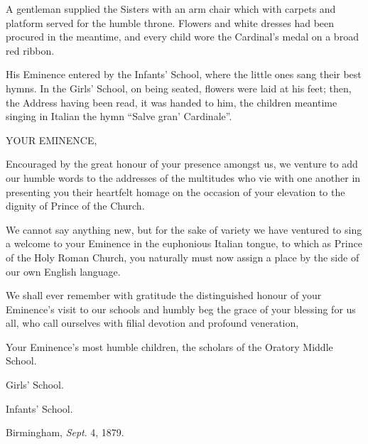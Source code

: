 A gentleman supplied the Sisters with an arm chair which with
carpets and platform served for the humble throne. Flowers and white
dresses had been procured in the meantime, and every child wore the
Cardinal's medal on a broad red ribbon.

His Eminence entered by the Infants' School, where the little ones
sang their best hymns. In the Girls' School, on being seated, flowers
were laid at his feet; then, the Address having been read, it was
handed to him, the children meantime singing in Italian the hymn
``Salve gran' Cardinale''.


YOUR EMINENCE,

Encouraged by the great honour of your presence amongst us, we venture
to add our humble words to the addresses of the multitudes who vie
with one another in presenting you their heartfelt homage on the
occasion of your elevation to the dignity of Prince of the Church.

We cannot say anything new, but for the sake of variety we have
ventured to sing a welcome to your Eminence in the euphonious Italian
tongue, to which as Prince of the Holy Roman Church, you naturally
must now assign a place by the side of our own English language.

We shall ever remember with gratitude the distinguished honour of
your Eminence's visit to our schools and humbly beg the grace of your
blessing for us all, who call ourselves with filial devotion and
profound veneration,

Your Eminence's most humble children, the scholars of the Oratory
Middle School.

Girls' School.

Infants' School.

Birmingham, \emph{Sept}. 4, 1879.

